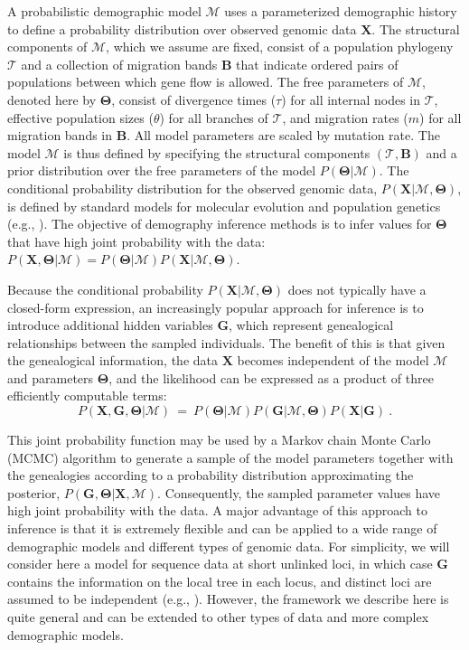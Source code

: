 \documentclass[11pt]{article}
\newcommand{\vect}[1]{\boldsymbol{\mathbf{#1}}}
\newcommand{\X}{\vect{X}}
\newcommand{\M}{\mathcal{M}}
\newcommand{\Tr}{\mathcal{T}}
\newcommand{\B}{\vect{B}}
\newcommand{\G}{\vect{G}}
\newcommand{\T}{\vect{\Theta}}
\begin{document}
A probabilistic demographic model $\M$ uses a parameterized demographic history to define a probability distribution over observed genomic data $\X$.
%
The structural components of $\M$, which we assume are fixed, consist of a population phylogeny $\Tr$ and a collection
of migration bands $\B$ that indicate ordered pairs of populations between which gene flow is allowed.
%
The free parameters of $\M$, denoted here by $\T$, consist of divergence times ($\tau$) for all internal nodes in $\Tr$,
effective population sizes ($\theta$) for all branches of $\Tr$, and migration rates ($m$) for all migration bands in $\B$.
%
All model parameters are scaled by mutation rate.
%
The model $\M$ is thus defined by specifying the structural components $(\Tr,\B)$ and a prior distribution over the free parameters of the model $P(\T|\M)$.
%
The conditional probability distribution for the observed genomic data, $P(\X|\M,\T)$, is defined by standard models for
molecular evolution and population genetics (e.g., \cite{JUKECANT69,KING82A}).
%
The objective of demography inference methods is to infer values for $\T$ that have high joint probability with the data:
$P(\X,\T|\M)=P(\T|\M)P(\X|\M,\T)$.

%
Because the conditional probability $P(\X|\M,\T)$ does not typically have a closed-form expression, an increasingly popular approach for
inference is to introduce additional hidden variables $\G$, which represent genealogical relationships
between the sampled individuals.
%
The benefit of this is that given the genealogical information, the data $\X$ becomes independent of the model $\M$ and parameters $\T$,
and the likelihood can be expressed as a product of three efficiently computable terms:
%
%
\begin{equation}\label{eq:likelihood}
 P(\X,\G,\T|\M) ~=~ P(\T|\M) P(\G|\M,\T) P(\X|\G)~.
\end{equation}
%
%

This joint probability function may be used by a Markov chain Monte Carlo (MCMC) algorithm to generate a sample of the model parameters
together with the genealogies according to a probability distribution approximating the posterior, $P(\G,\T|\X,\M)$.
%
Consequently, the sampled parameter values have high joint probability with the data.
%
A major advantage of this approach to inference is that it is extremely flexible and can be applied to a wide range of demographic models and
different types of genomic data.
%
For simplicity, we will consider here a model for sequence data at  short unlinked loci, in which case 
$\G$ contains the information on the local tree in each locus, and distinct loci are assumed to be independent (e.g., \cite{NIELWAKE01,RANNYANG03,GRONETAL11}).
%
However, the framework we describe here is quite general and can be extended to other types of data and more complex demographic models.
\end{document}

